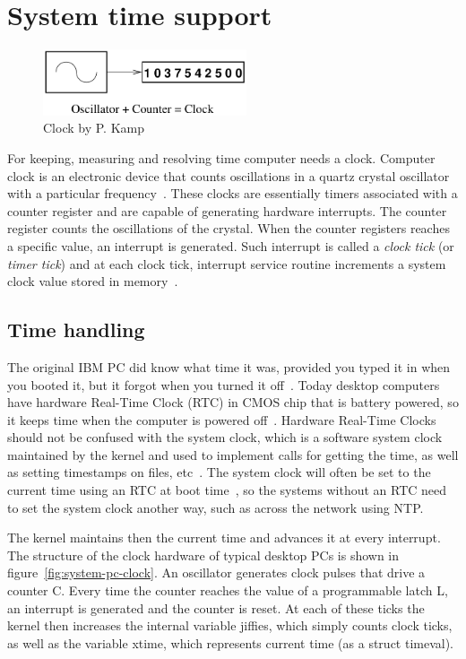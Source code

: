 
\chapter{System time support}
\begin{figure}
	\centering
	\includegraphics[width=6cm,keepaspectratio]{fig/clock.png}
	\caption{Clock by P. Kamp}
	\label{fig:hw-clock}
\end{figure}
For keeping, measuring and resolving time computer needs a clock.
Computer clock is an electronic device that counts oscillations in a
quartz crystal oscillator with a particular frequency~\cite{thesis-sync}.
These clocks are essentially timers associated with a counter register and
are capable of generating hardware interrupts.
The counter register counts the oscillations of the crystal.
When the counter registers reaches a specific value,
an interrupt is generated.
Such interrupt is called a {\it{clock tick}} (or {\it{timer tick}}) and at each clock tick,
interrupt service routine increments a system clock value stored in memory~\cite{thesis-sync}.

\section{Time handling}
The original IBM PC did know what time it was, provided you typed it in when you booted it,
but it forgot when you turned it off~\cite{timecounters}.
Today desktop computers %
have hardware Real-Time Clock (RTC) in CMOS chip that is battery powered,
so it keeps time when the computer is powered off~\cite{timecounters}.
Hardware Real-Time Clocks should not be confused with the system clock,
which is a software system clock maintained by
the kernel and used to implement calls for getting the time,
as well as setting timestamps on files, etc~\cite{linux-man-rtc}.
The system clock will often be set to the current time using an RTC at boot time~\cite{linux-man-rtc},
so the systems without an RTC need to set the system clock another way,
such as across the network using NTP.

The kernel maintains then the current time and advances it at every interrupt.
The structure of the clock hardware of
typical desktop PCs is shown in figure~\ref{fig:system-pc-clock}.
An oscillator generates clock pulses that drive a counter C.
Every time the counter reaches the value of a programmable latch L,
an interrupt is generated and the counter is reset.
At each of these ticks the kernel then increases the internal variable jiffies,
which simply counts clock ticks, as well as the variable xtime,
which represents current time (as a struct timeval).

